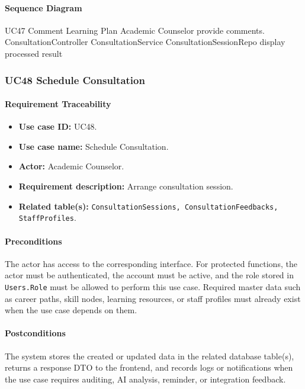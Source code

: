 \paragraph{Sequence Diagram}

\SequenceDiagram
{UC47 Comment Learning Plan}
{Academic Counselor}
{provide comments.}
{ConsultationController}
{ConsultationService}
{ConsultationSessionRepo}
{display processed result}

\subsubsection{UC48 Schedule Consultation}

\paragraph{Requirement Traceability}

\begin{itemize}
    \item \textbf{Use case ID:} UC48.
    \item \textbf{Use case name:} Schedule Consultation.
    \item \textbf{Actor:} Academic Counselor.
    \item \textbf{Requirement description:} Arrange consultation session.
    \item \textbf{Related table(s):} \texttt{ConsultationSessions, ConsultationFeedbacks, StaffProfiles}.
\end{itemize}

\paragraph{Preconditions}

The actor has access to the corresponding interface. For protected functions, the actor must be authenticated, the account must be active, and the role stored in \texttt{Users.Role} must be allowed to perform this use case. Required master data such as career paths, skill nodes, learning resources, or staff profiles must already exist when the use case depends on them.

\paragraph{Postconditions}

The system stores the created or updated data in the related database table(s), returns a response DTO to the frontend, and records logs or notifications when the use case requires auditing, AI analysis, reminder, or integration feedback.

